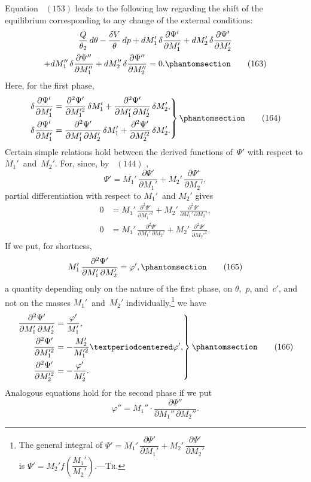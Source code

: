 \documentclass[12pt]{book}[2005/09/16]
\newcommand{\Chg}[2]{#2}
\newcommand{\Add}[1]{\Chg{}{#1}}
\newcommand{\Tag}[1]{%
  \phantomsection\label{eqn:#1}\tag*{\ensuremath{#1}}%
}
\newcommand{\Eq}[1]{%
  \hyperref[eqn:#1]{\ensuremath{#1}}%
}
\newcommand{\PageSep}[1]{\ignorespaces}
\newcommand{\Tr}{\textsc{Tr}}
\newcommand{\dd}{\partial}
\begin{document}
Equation~\Eq{(153)} leads to the following law regarding the
shift of the equilibrium corresponding to any change of the
external conditions:
\begin{multline*}
\frac{Q}{\theta_{2}}\, d\theta - \frac{\delta V}{\theta}\, dp
  + dM_{1}'\, \delta \frac{\dd \Psi'}{\dd M_{1}'}
  + dM_{2}'\, \delta \frac{\dd \Psi'}{\dd M_{2}'} \\
  + dM_{1}''\, \delta \frac{\dd \Psi''}{\dd M_{1}''}
  + dM_{2}''\, \delta \frac{\dd \Psi''}{\dd M_{2}''} = 0.
\Tag{(163)}
\end{multline*}
Here, for the first phase,
\[
\left.
\begin{aligned}
\delta \frac{\dd \Psi'}{\dd M_{1}'}
  &= \frac{\dd^{2} \Psi'}{\dd M_{1}'^{2}}\, \delta M_{1}'
   + \frac{\dd^{2} \Psi'}{\dd M_{1}'\, \dd M_{2}'}\, \delta M_{2}'\Add{,} \\
\delta \frac{\dd \Psi'}{\dd M_{1}'}
  &= \frac{\dd^{2} \Psi'}{\dd M_{1}'\, \dd M_{2}'}\, \delta M_{1}'
   + \frac{\dd^{2} \Psi'}{\dd M_{2}'^{2}}\, \delta M_{2}'\Add{.}
\end{aligned}
\right\}
\Tag{(164)}
\]
Certain simple relations hold between the derived functions
of~$\Psi'$ with respect to $M_{1}'$~and~$M_{2}'$. For, since, by~\Eq{(144)},
\[
\Psi' = M_{1}'\, \frac{\dd \Psi'}{\dd M_{1}'} + M_{2}'\, \frac{\dd \Psi'}{\dd M_{2}'},
\]
partial differentiation with respect to $M_{1}'$~and $M_{2}'$ gives
\begin{align*}
0 &= M_{1}'\, \frac{\dd^{2} \Psi'}{\dd M_{1}'^{2}}
   + M_{2}'\, \frac{\dd^{2} \Psi'}{\dd M_{1}'\, \dd M_{2}'}, \\
0 &= M_{1}'\, \frac{\dd^{2} \Psi'}{\dd M_{1}'\, \dd M_{2}'}
   + M_{2}'\, \frac{\dd^{2} \Psi'}{\dd M_{2}'^{2}}.
\end{align*}
If we put, for shortness,
\[
M_{1}'\, \frac{\dd^{2} \Psi'}{\dd M_{1}'\, \dd M_{2}'} = \varphi',
\Tag{(165)}
\]
\PageSep{193}
a quantity depending only on the nature of the first phase,
on $\theta$,~$p$, and~$c'$, and not on the masses $M_{1}'$~and~$M_{2}'$ individually,\footnote
  {The general integral of $\Psi' = M_{1}'\, \dfrac{\dd \Psi'}{\dd M_{1}'} + M_{2}'\, \dfrac{\dd \Psi'}{\dd M_{2}'}$ \\ is $\Psi' = M_{2}' f\left(\dfrac{M_{1}'}{M_{2}'}\right)$.---\Tr.}
we have
\[
\left.
\begin{aligned}
\frac{\dd^{2} \Psi'}{\dd M_{1}'\, \dd M_{2}'} &= \frac{\varphi'}{M_{1}'}\Add{,} \\
\frac{\dd^{2} \Psi'}{\dd M_{1}'^{2}} &= -\frac{M_{2}'}{M_{1}'^{2}} · \varphi'\Add{,} \\
\frac{\dd^{2} \Psi'}{\dd M_{2}'^{2}} &= -\frac{\varphi'}{M_{2}'}\Add{.}
\end{aligned}
\right\}
\Tag{(166)}
\]
Analogous equations hold for the second phase if we put
\[
\varphi'' = M_{1}'' · \frac{\dd \Psi''}{\dd M_{1}''\, \dd M_{2}''}.
\]
\end{document}
